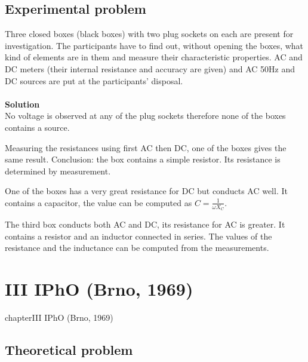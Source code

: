 \documentclass[12pt,a4paper]{book}
\begin{document}
\section*{Experimental problem}
	Three closed boxes (black boxes) with two plug sockets on each are present for investigation. The participants have to f\mbox{}ind out, without opening the boxes, what kind of elements are in them and measure their characteristic properties. AC and DC meters (their internal resistance and accuracy are given) and AC 50Hz and DC sources are put at the participants' disposal.\\ \\
	\textbf{Solution}\\
	No voltage is observed at any of the plug sockets therefore none of the boxes contains a source.\par
	Measuring the resistances using f\mbox{}irst AC then DC, one of the boxes gives the same result. Conclusion: the box contains a simple resistor. Its resistance is determined by measurement.\par
	One of the boxes has a very great resistance for DC but conducts AC well. It contains a capacitor, the value can be computed as $C=\frac{1}{\omega X_C}$.\par
	The third box conducts both AC and DC, its resistance for AC is greater. It contains a resistor and an inductor connected in series. The values of the resistance and the inductance can be computed from the measurements.
\chapter*{III IPhO (Brno, 1969)}
{chapter}{III IPhO (Brno, 1969)}
\section*{Theoretical problem}
\end{document}
